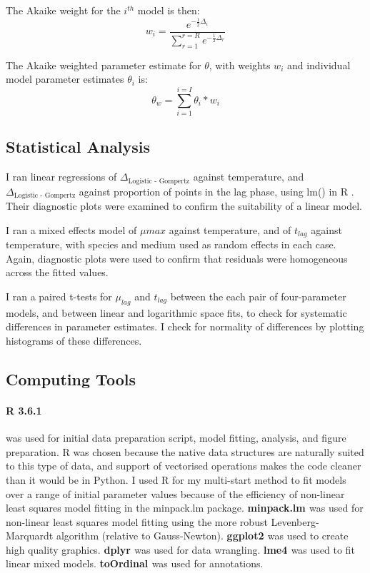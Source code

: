 \documentclass[11pt, a4paper]{article}
\begin{document}
\begin{linenumbers}
The Akaike weight for the $i^{th}$ model is then:
\[ w_i = \frac{e^{-\frac{1}{2}\Delta_i }} { \sum_{r = 1}^{r = R}  e^{- \frac{1}{2}\Delta_r }}\]

The Akaike weighted parameter estimate for $\theta$, with weights $w_i$ and individual model parameter estimates $\theta_i$ is:
\[\theta_w = \sum_{i = 1}^{i = I}\theta_i * w_i\]


\subsection{Statistical Analysis}

I ran linear regressions of $\Delta_{\text{Logistic - Gompertz}}$ against temperature, and $\Delta_{\text{Logistic - Gompertz}}$ against proportion of points in the lag phase, using lm() in R \cite{R}. Their diagnostic plots were examined to confirm the suitability of a linear model.

I ran a mixed effects model of $\mu{max}$ against temperature, and of $t_{lag}$ against temperature, with species and medium used as random effects in each case. Again, diagnostic plots were used to confirm that residuals were homogeneous across the fitted values.

I ran a paired t-tests for $\mu_{lag}$ and $t_{lag}$ between the each pair of four-parameter models, and between linear and logarithmic space fits, to check for systematic differences in parameter estimates. I check for normality of differences by plotting histograms of these differences.  

\subsection{Computing Tools}
\paragraph{R 3.6.1 \cite{R}} was used for initial data preparation script, model fitting, analysis, and figure preparation. R was chosen because the native data structures are naturally suited to this type of data, and support of vectorised operations makes the code cleaner than it would be in Python. I used R for my multi-start method to fit models over a range of initial parameter values because of the efficiency of non-linear least squares model fitting in the minpack.lm package. \textbf{minpack.lm \cite{minpack}} was used for non-linear least squares model fitting using the more robust Levenberg-Marquardt algorithm (relative to Gauss-Newton). \textbf{ggplot2 \cite{gg}} was used to create high quality graphics. \textbf{dplyr \cite{dplyr}} was used for data wrangling. \textbf{lme4 \cite{lme4}} was used to fit linear mixed models. \textbf{toOrdinal \cite{tO}} was used for annotations.


\end{linenumbers}
\end{document}
